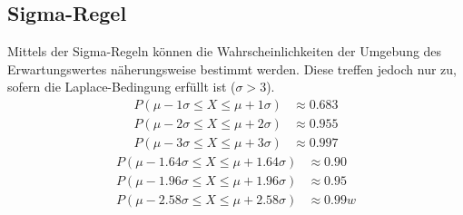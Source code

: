 \documentclass[a4paper]{article}
\begin{document}
		\subsection{Sigma-Regel}
			Mittels der Sigma-Regeln können die Wahrscheinlichkeiten der Umgebung des Erwartungswertes näherungsweise bestimmt werden. Diese treffen jedoch nur zu, sofern die Laplace-Bedingung erfüllt ist ($\sigma > 3$).
			\begin{subequations}
				\begin{align}
					P(\mu - 1\sigma \leq X \leq \mu + 1\sigma) &\approx 0.683\\
					P(\mu - 2\sigma \leq X \leq \mu + 2\sigma) &\approx 0.955\\
					P(\mu - 3\sigma \leq X \leq \mu + 3\sigma) &\approx 0.997
				\end{align}
			\end{subequations}
			\begin{subequations}
				\begin{align}
				P(\mu - 1.64\sigma \leq X \leq \mu + 1.64\sigma) &\approx 0.90\\
				P(\mu - 1.96\sigma \leq X \leq \mu + 1.96\sigma) &\approx 0.95\\
				P(\mu - 2.58\sigma \leq X \leq \mu + 2.58\sigma) &\approx 0.99w
				\end{align}
			\end{subequations}
			
\end{document}
